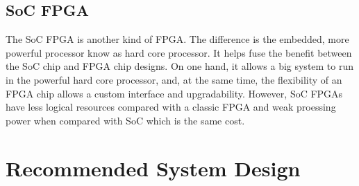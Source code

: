 \documentclass[12pt,article]{memoir}
\begin{document}
\section{SoC FPGA}
The SoC FPGA is another kind of FPGA. The difference is the embedded, more powerful processor know as hard core processor. It helps fuse the benefit between the SoC chip and FPGA chip designs.\cite{blog:socFPGA} On one hand, it allows a big system to run in the powerful hard core processor, and, at the same time, the flexibility of an FPGA chip allows a custom interface and upgradability. However, SoC FPGAs have less logical resources compared with a classic FPGA and weak proessing power when compared with SoC which is the same cost.
\newpage
\chapter{Recommended System Design}
\end{document}
